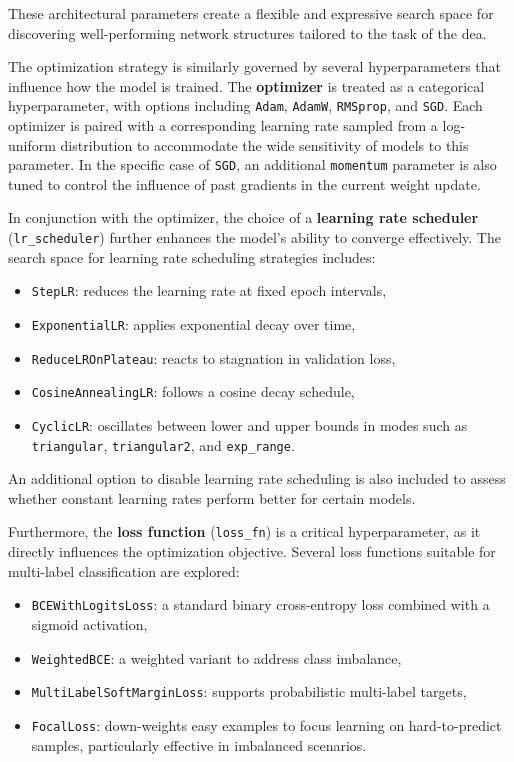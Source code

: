 These architectural parameters create a flexible and expressive search space for discovering well-performing network structures tailored to the task of the \ac{dea}.

The optimization strategy is similarly governed by several hyperparameters that influence how the model is trained.
The \textbf{optimizer} is treated as a categorical hyperparameter, with options including \texttt{Adam}, \texttt{AdamW}, \texttt{RMSprop}, and \texttt{SGD}.
Each optimizer is paired with a corresponding learning rate sampled from a log-uniform distribution to accommodate the wide sensitivity of models to this parameter.
In the specific case of \texttt{SGD}, an additional \texttt{momentum} parameter is also tuned to control the influence of past gradients in the current weight update.

In conjunction with the optimizer, the choice of a \textbf{learning rate scheduler} (\texttt{lr\_scheduler}) further enhances the model's ability to converge effectively.
The search space for learning rate scheduling strategies includes:
\begin{itemize}
    \item \texttt{StepLR}: reduces the learning rate at fixed epoch intervals,
    \item \texttt{ExponentialLR}: applies exponential decay over time,
    \item \texttt{ReduceLROnPlateau}: reacts to stagnation in validation loss,
    \item \texttt{CosineAnnealingLR}: follows a cosine decay schedule,
    \item \texttt{CyclicLR}: oscillates between lower and upper bounds in modes such as \texttt{triangular}, \texttt{triangular2}, and \texttt{exp\_range}.
\end{itemize}
An additional option to disable learning rate scheduling is also included to assess whether constant learning rates perform better for certain models.

Furthermore, the \textbf{loss function} (\texttt{loss\_fn}) is a critical hyperparameter, as it directly influences the optimization objective.
Several loss functions suitable for multi-label classification are explored:
\begin{itemize}
    \item \texttt{BCEWithLogitsLoss}: a standard binary cross-entropy loss combined with a sigmoid activation,
    \item \texttt{WeightedBCE}: a weighted variant to address class imbalance,
    \item \texttt{MultiLabelSoftMarginLoss}: supports probabilistic multi-label targets,
    \item \texttt{FocalLoss}: down-weights easy examples to focus learning on hard-to-predict samples, particularly effective in imbalanced scenarios.
\end{itemize}

